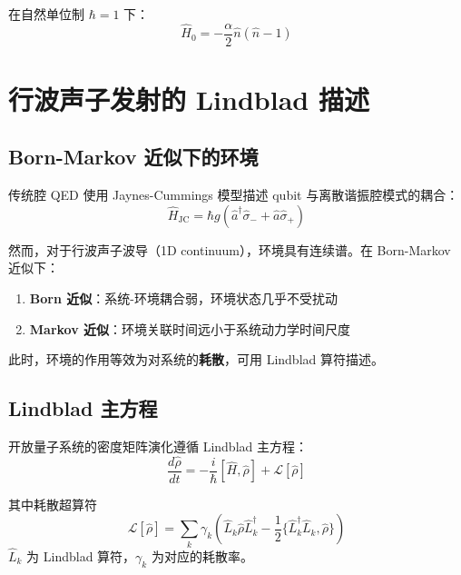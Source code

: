 \documentclass[12pt,a4paper]{article}
\theoremstyle{definition}
\begin{document}
在自然单位制 $\hbar = 1$ 下：
\begin{equation}
    \boxed{\hat{H}_0 = -\frac{\alpha}{2}\hat{n}(\hat{n}-1)}
\end{equation}

\section{行波声子发射的 Lindblad 描述}

\subsection{Born-Markov 近似下的环境}

传统腔 QED 使用 Jaynes-Cummings 模型描述 qubit 与离散谐振腔模式的耦合：
\begin{equation}
    \hat{H}_{\text{JC}} = \hbar g(\hat{a}^\dagger\hat{\sigma}_- + \hat{a}\hat{\sigma}_+)
\end{equation}

然而，对于行波声子波导（1D continuum），环境具有连续谱。在 Born-Markov 近似下：
\begin{enumerate}
    \item \textbf{Born 近似}：系统-环境耦合弱，环境状态几乎不受扰动
    \item \textbf{Markov 近似}：环境关联时间远小于系统动力学时间尺度
\end{enumerate}

此时，环境的作用等效为对系统的\textbf{耗散}，可用 Lindblad 算符描述。

\subsection{Lindblad 主方程}

开放量子系统的密度矩阵演化遵循 Lindblad 主方程：
\begin{equation}
    \frac{d\hat{\rho}}{dt} = -\frac{i}{\hbar}[\hat{H}, \hat{\rho}] + \mathcal{L}[\hat{\rho}]
    \label{eq:lindblad_master}
\end{equation}

其中耗散超算符
\begin{equation}
    \mathcal{L}[\hat{\rho}] = \sum_k \gamma_k \left(\hat{L}_k\hat{\rho}\hat{L}_k^\dagger - \frac{1}{2}\{\hat{L}_k^\dagger\hat{L}_k, \hat{\rho}\}\right)
    \label{eq:dissipator}
\end{equation}
$\hat{L}_k$ 为 Lindblad 算符，$\gamma_k$ 为对应的耗散率。
\end{document}
